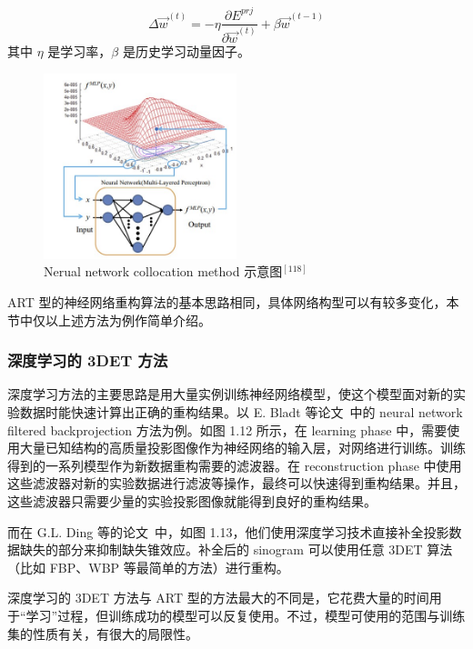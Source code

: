 \begin{equation}
\Delta \vec{w}^{(t)} = -\eta \frac{\partial E^{prj}}{\partial \vec{w}^{(t)}} + \beta \vec{w}^{(t-1)}
\end{equation}
其中 $\eta$ 是学习率，$\beta$ 是历史学习动量因子。

\begin{figure}[htbp]
	\vspace{\baselineskip}
	\centering
	\includegraphics[width=0.5\textwidth]{../1.17/117}
	\caption{Nerual network collocation method 示意图$^{[118]}$}\label{fig:117}
\end{figure}

ART 型的神经网络重构算法的基本思路相同，具体网络构型可以有较多变化，本节中仅以上述方法为例作简单介绍。

\subsubsection{深度学习的 3DET 方法}
深度学习方法的主要思路是用大量实例训练神经网络模型，使这个模型面对新的实验数据时能快速计算出正确的重构结果。以 E. Bladt 等论文~\cite{Bladt2015}中的 neural network filtered backprojection 方法为例。如图 1.12 所示，在 learning phase 中，需要使用大量已知结构的高质量投影图像作为神经网络的输入层，对网络进行训练。训练得到的一系列模型作为新数据重构需要的滤波器。在 reconstruction phase 中使用这些滤波器对新的实验数据进行滤波等操作，最终可以快速得到重构结果。并且，这些滤波器只需要少量的实验投影图像就能得到良好的重构结果。

而在 G.L. Ding 等的论文~\cite{Ding2019}中，如图 1.13，他们使用深度学习技术直接补全投影数据缺失的部分来抑制缺失锥效应。补全后的 sinogram 可以使用任意 3DET 算法（比如 FBP、WBP 等最简单的方法）进行重构。

深度学习的 3DET 方法与 ART 型的方法最大的不同是，它花费大量的时间用于“学习”过程，但训练成功的模型可以反复使用。不过，模型可使用的范围与训练集的性质有关，有很大的局限性。

